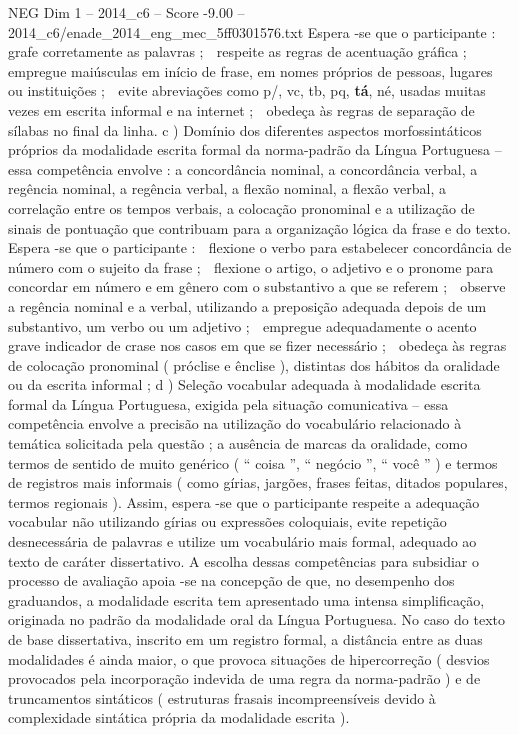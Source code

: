 \begin{textsample}{NEG Dim 1 – 2014\_c6 – Score -9.00 – 2014\_c6/enade\_2014\_eng\_mec\_5ff0301576.txt}
Espera -se que o participante :  grafe corretamente as palavras ;  respeite as regras de acentuação gráfica ;  empregue maiúsculas em início de frase, em nomes próprios de pessoas, lugares ou instituições ;  evite abreviações como p/, vc, tb, pq, \textbf{tá}, né, usadas muitas vezes em escrita informal e na internet ;  obedeça às regras de separação de sílabas no final da linha. c ) Domínio dos diferentes aspectos morfossintáticos próprios da modalidade escrita formal da norma-padrão da Língua Portuguesa – essa competência envolve : a concordância nominal, a concordância verbal, a regência nominal, a regência verbal, a flexão nominal, a flexão verbal, a correlação entre os tempos verbais, a colocação pronominal e a utilização de sinais de pontuação que contribuam para a organização lógica da frase e do texto.
Espera -se que o participante :  flexione o verbo para estabelecer concordância de número com o sujeito da frase ;  flexione o artigo, o adjetivo e o pronome para concordar em número e em gênero com o substantivo a que se referem ;  observe a regência nominal e a verbal, utilizando a preposição adequada depois de um substantivo, um verbo ou um adjetivo ;  empregue adequadamente o acento grave indicador de crase nos casos em que se fizer necessário ;  obedeça às regras de colocação pronominal ( próclise e ênclise ), distintas dos hábitos da oralidade ou da escrita informal ; d ) Seleção vocabular adequada à modalidade escrita formal da Língua Portuguesa, exigida pela situação comunicativa – essa competência envolve a precisão na utilização do vocabulário relacionado à temática solicitada pela questão ; a ausência de marcas da oralidade, como termos de sentido de muito genérico ( “ coisa ”, “ negócio ”, “ você ” ) e termos de registros mais informais ( como gírias, jargões, frases feitas, ditados populares, termos regionais ).
Assim, espera -se que o participante respeite a adequação vocabular não utilizando gírias ou expressões coloquiais, evite repetição desnecessária de palavras e utilize um vocabulário mais formal, adequado ao texto de caráter dissertativo.
A escolha dessas competências para subsidiar o processo de avaliação apoia -se na concepção de que, no desempenho dos graduandos, a modalidade escrita tem apresentado uma intensa simplificação, originada no padrão da modalidade oral da Língua Portuguesa.
No caso do texto de base dissertativa, inscrito em um registro formal, a distância entre as duas modalidades é ainda maior, o que provoca situações de hipercorreção ( desvios provocados pela incorporação indevida de uma regra da norma-padrão ) e de truncamentos sintáticos ( estruturas frasais incompreensíveis devido à complexidade sintática própria da modalidade escrita ).

\end{textsample}
